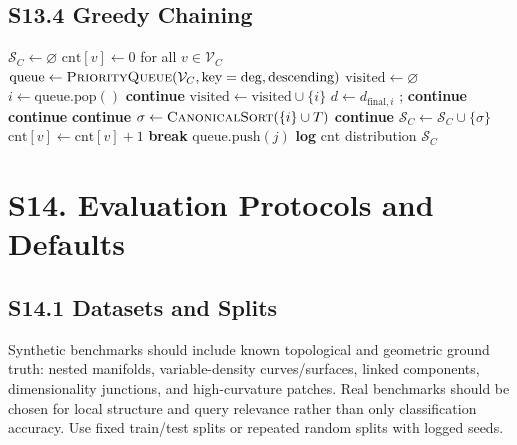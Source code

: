 \documentclass[11pt]{article}
\begin{document}
\subsection*{S13.4 Greedy Chaining}
\begin{algorithm}[h]
\caption{Greedy Chaining: node-seeded simplex discovery}
\label{alg:greedy-chaining}
\begin{algorithmic}[1]
    \State $\mathcal S_C\gets\varnothing$ 
    \State $\mathrm{cnt}[v]\gets0$ for all $v\in\mathcal V_C$
    \State $\mathrm{queue}\gets\textsc{PriorityQueue}(\mathcal V_C,\text{key}=\deg,\text{descending})$
    \State $\mathrm{visited}\gets\varnothing$
        \State $i\gets\mathrm{queue}.\mathrm{pop}()$
         \textbf{continue} \EndIf
        \State $\mathrm{visited}\gets\mathrm{visited}\cup\{i\}$
        \State $d\gets d_{\mathrm{final},i}$
         \State {}; \textbf{continue} \EndIf
         \textbf{continue} \EndIf
             \textbf{continue} \EndIf
            \State $\sigma\gets\textsc{CanonicalSort}(\{i\}\cup T)$
             \textbf{continue} \EndIf
            \State $\mathcal S_C\gets\mathcal S_C\cup\{\sigma\}$
             \State $\mathrm{cnt}[v]\gets\mathrm{cnt}[v]+1$ \EndFor
             \textbf{break} \EndIf
        \EndFor
             \State $\mathrm{queue}.\mathrm{push}(j)$ \EndIf
        \EndFor
    \EndWhile
    \State \textbf{log} $\mathrm{cnt}$ distribution 
    \State \Return $\mathcal S_C$
\EndProcedure
\end{algorithmic}
\end{algorithm}

\section*{S14. Evaluation Protocols and Defaults}

\subsection*{S14.1 Datasets and Splits}
Synthetic benchmarks should include known topological and geometric ground truth: nested manifolds, variable-density curves/surfaces, linked components, dimensionality junctions, and high-curvature patches. Real benchmarks should be chosen for local structure and query relevance rather than only classification accuracy. Use fixed train/test splits or repeated random splits with logged seeds.
\end{document}
